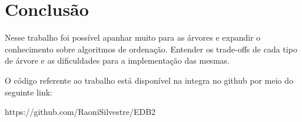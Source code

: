 \section{Conclusão}

Nesse trabalho foi possível apanhar muito para as árvores e 
expandir o conhecimento sobre algoritmos de ordenação. Entender os trade-offs
de cada tipo de árvore e as dificuldades para a implementação das mesmas.

O código referente ao trabalho está disponível na integra no github por meio do seguinte link:

https://github.com/RaoniSilvestre/EDB2
